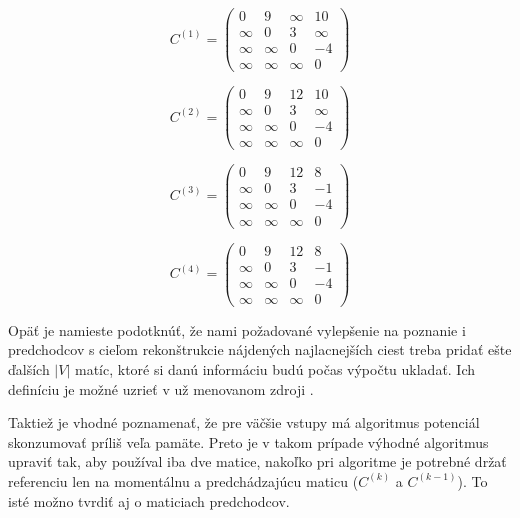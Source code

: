 \begin{equation}
  \label{C1}
  C^{(1)} =
  \begin{pmatrix}
    0 & 9 & \infty & 10 \\
    \infty & 0 & 3 & \infty \\
    \infty & \infty & 0 & -4 \\
    \infty & \infty & \infty & 0
  \end{pmatrix}
\end{equation}

\begin{equation}
  \label{C2}
  C^{(2)} =
  \begin{pmatrix}
    0 & 9 & 12 & 10 \\
    \infty & 0 & 3 & \infty \\
    \infty & \infty & 0 & -4 \\
    \infty & \infty & \infty & 0
  \end{pmatrix}
\end{equation}

\begin{equation}
  \label{C3}
  C^{(3)} =
  \begin{pmatrix}
    0 & 9 & 12 & 8 \\
    \infty & 0 & 3 & -1 \\
    \infty & \infty & 0 & -4 \\
    \infty & \infty & \infty & 0
  \end{pmatrix}
\end{equation}

\begin{equation}
  \label{C4}
  C^{(4)} =
  \begin{pmatrix}
    0 & 9 & 12 & 8 \\
    \infty & 0 & 3 & -1 \\
    \infty & \infty & 0 & -4 \\
    \infty & \infty & \infty & 0
  \end{pmatrix}
\end{equation}

Opäť je namieste podotknúť, že nami požadované vylepšenie na poznanie i predchodcov s cieľom rekonštrukcie nájdených najlacnejších ciest treba pridať ešte ďalších $|V|$ matíc, ktoré si danú informáciu budú počas výpočtu ukladať. Ich definíciu je možné uzrieť v už menovanom zdroji \cite[kapitola 2.2.2]{duris2009}.\newline

Taktiež je vhodné poznamenať, že pre väčšie vstupy má algoritmus potenciál skonzumovať príliš veľa pamäte. Preto je v takom prípade výhodné algoritmus upraviť tak, aby používal iba dve matice, nakoľko pri algoritme je potrebné držať referenciu len na momentálnu a predchádzajúcu maticu ($C^{(k)}$ a $C^{(k-1)}$). To isté možno tvrdiť aj o maticiach predchodcov.\newline


